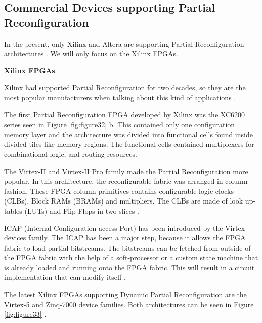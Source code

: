 \documentclass[twoside]{romjist}
\begin{document}
	\subsection{Commercial Devices supporting Partial Reconfiguration}
	\hspace{0.5cm}
	In the present, only Xilinx and Altera are supporting Partial Reconfiguration architectures \cite{2}.
	We will only focus on the Xilinx FPGAs.
	
	\textbf{\newline Xilinx FPGAs}
	
	\hspace{0.5cm}Xilinx had supported Partial Reconfiguration for two decades, so they are the most popular
	manufacturers when talking about this kind of applications \cite{7}.
	
	
	\hspace{0.5cm}The first Partial Reconfiguration FPGA developed by Xilinx was the XC6200 series seen in
	Figure \ref{fig:figure32} b. This contained only one configuration memory layer and the architecture was
	divided into functional cells found inside divided tiles-like memory regions. The functional
	cells contained multiplexers for combinational logic, and routing resources.
	
	
	\hspace{0.5cm}The Virtex-II and Virtex-II Pro family made the Partial Reconfiguration more popular. In this
	architecture, the reconfigurable fabric was arranged in column fashion. These FPGA column
	primitives contains configurable logic clocks (CLBs), Block RAMs (BRAMs) and multipliers.
	The CLBs are made of look up-tables (LUTs) and Flip-Flops in two slices \cite{5}.
	
	
	\hspace{0.5cm}ICAP (Internal Configuration access Port) has been introduced by the Virtex devices family.
	The ICAP has been a major step, because it allows the FPGA fabric to load partial bitstreams.
	The bitstreams can be fetched from outside of the FPGA fabric with the help of a soft-processor
	or a custom state machine that is already loaded and running onto the FPGA fabric. This will
	result in a circuit implementation that can modify itself \cite{5}.
	
	
	\hspace{0.5cm}The latest Xilinx FPGAs supporting Dynamic Partial Reconfiguration are the Virtex-5 and
	Zinq-7000 device families. Both architectures can be seen in Figure \ref{fig:figure33} \cite{5}.
	
\end{document}
